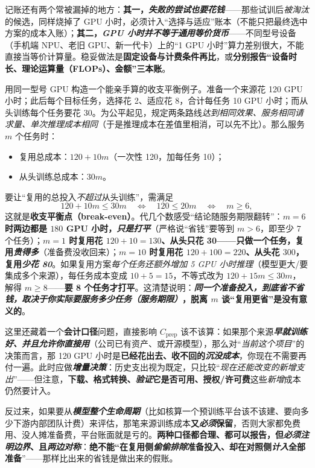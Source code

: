 记账还有两个常被漏掉的地方：\textbf{其一，\emph{失败的尝试也要花钱}}——那些试训后\emph{被淘汰}的候选，同样烧掉了 GPU 小时，必须计入“选择与适应”账本（不能只把最终选中方案的成本入账）；\textbf{其二，\emph{GPU 小时并不等于通用等价货币}}——不同型号设备（手机端 NPU、老旧 GPU、新一代卡）上的“1 GPU 小时”算力差别很大，不能直接当等价计算量。稳妥做法是\textbf{固定设备与计费条件再比}，或\textbf{分别报告“设备时长、理论运算量（FLOPs）、金额”三本账}。

用同一型号 GPU 构造一个能亲手算的收支平衡例子。准备一个来源花 120 GPU 小时；此后每个目标任务，选择花 2、适应花 8，合计每任务 10 GPU 小时；而从头训练每个任务要花 30。为公平起见，规定两条路线\emph{达到相同效果、服务相同请求量、单次推理成本相同}（于是推理成本在差值里相消，可以先不比）。那么服务 $m$ 个任务时：
\begin{itemize}\item 复用总成本：$120+10m$（一次性 120，加每任务 10）；\item 从头训练总成本：$30m$。\end{itemize}
要让“复用的总投入\emph{不超过}从头训练”，需满足
\begin{equation}
  120+10m\leq30m
  \quad\Longleftrightarrow\quad 120\leq20m
  \quad\Longleftrightarrow\quad m\geq6,
  \label{eq:ket-reuse-break-even}
\end{equation}
这就是\textbf{收支平衡点（break-even）}。代几个数感受“结论随服务期限翻转”：\textbf{$m=6$ 时两边都是 $180$ GPU 小时，\emph{只是打平}}（严格说“省钱”要等到 $m>6$，即至少 7 个任务）；\textbf{$m=1$ 时复用花 $120+10=130$、从头只花 30——只做一个任务，复用\emph{贵得多}}（准备费没收回来）；\textbf{$m=10$ 时复用花 $120+100=220$、从头花 $300$，复用\emph{少花 80}}。如果复用方案\emph{每个任务还额外增加 5 GPU 小时推理}（模型更大/要集成多个来源），每任务成本变成 $10+5=15$，不等式改为 $120+15m\leq30m$，解得 $m\geq8$——\textbf{要 8 个任务才打平}。这清楚说明：\textbf{\emph{同一个准备投入，到底省不省钱，\emph{取决于你实际要服务多少任务（服务期限）}}，脱离 $m$ 谈“复用更省”是没有意义的}。

这里还藏着一个\textbf{会计口径}问题，直接影响 $C_{\mathrm{prep}}$ 该不该算：如果那个来源\textbf{\emph{早就训练好、并且允许你直接用}}（公司已有资产、或开源模型），那么对“\emph{当前这个项目}”的决策而言，那 120 GPU 小时是\textbf{已经花出去、收不回的\emph{沉没成本}}，你现在不需要再付一遍。此时应做\textbf{\emph{增量决策}}：历史支出视为既定，只比较“\emph{现在还能改变的新增支出}”——但注意，\textbf{下载、格式转换、\emph{验证}它是否可用、授权/许可费}这些\emph{新增}成本仍然要计入。

反过来，如果要从\textbf{\emph{模型整个生命周期}}（比如核算一个预训练平台该不该建、要向多少下游内部团队计费）来评估，那笔来源训练成本\textbf{又\emph{必须}保留}，否则大家都免费用、没人摊准备费，平台账面就是亏的。\textbf{两种口径都合理、都可以报告，但\emph{必须注明边界}、且\emph{两边对称}}：\textbf{绝不能“在复用侧\emph{偷偷排除}准备投入、却在对照侧\emph{计入}全部准备}”——那样比出来的省钱是做出来的假账。

